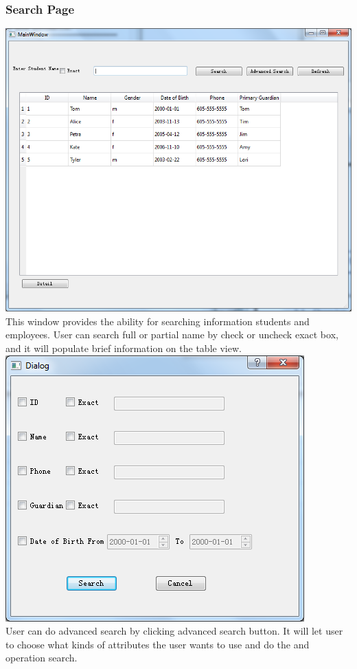 \subsubsection{Search Page}
\includegraphics[scale=0.5]{pics/search.png}\\
This window provides the ability for searching information students and employees. User can search full or partial name by check or uncheck exact box, and it will populate brief information on the table view.
\includegraphics[scale=0.5]{pics/adv_search.png}\\
User can do advanced search by clicking advanced search button. It will let user to choose what kinds of attributes the user wants to use and do the and operation search.\\
